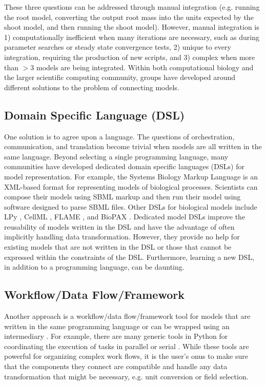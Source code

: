 \documentclass[journal]{IEEEtran}
\begin{document}
These three questions can be addressed through manual integration (e.g. running the root model, converting the output root mass into the units expected by the shoot model, and then running the shoot model). However, manual integration is 1) computationally inefficient when many iterations are necessary, such as during parameter searches or steady state convergence tests, 2) unique to every integration, requiring the production of new scripts, and 3) complex when more than $>3$ models are being integrated. Within both computational biology and the larger scientific computing community, groups have developed around different solutions to the problem of connecting models.

\subsection{Domain Specific Language (DSL)}\label{SS:dsl}
%
One solution is to agree upon a language. The questions of orchestration, communication, and translation become trivial when models are all written in the same language. Beyond selecting a single programming language, many communities have  developed dedicated domain specific languages (DSLs) for model representation. For example, the Systems Biology Markup Language \citep[SBML][]{Hucka2003} is an XML-based format for representing models of biological processes. Scientists can compose their models using SBML markup and then run their model using software designed to parse SBML files. Other DSLs for biological models include LPy \citep{Boudon2012}, CellML \citep{Cuellar2003}, FLAME \citep{Coakley2012}, and BioPAX \citep{Demir2010}. Dedicated model DSLs improve the reusability of models written in the DSL and have the advantage of often implicitly handling data transformation. However, they provide no help for existing models that are not written in the DSL or those that cannot be expressed within the constraints of the DSL. Furthermore, learning a new DSL, in addition to a programming language, can be daunting.

\subsection{Workflow/Data Flow/Framework}\label{SS:framework}
%
Another approach is a workflow/data flow/framework tool for models that are written in the same programming language or can be wrapped using an intermediary \citep[e.g. Cython, ][]{Behnel2011a}. For example, there are many generic tools in Python for coordinating the execution of tasks in parallel or serial \citep[e.g.][]{babuji18, celery, luigi}. While these tools are powerful for organizing complex work flows, it is the user's onus to make sure that the components they connect are compatible and handle any data transformation that might be necessary, e.g. unit conversion or field selection.
\end{document}

